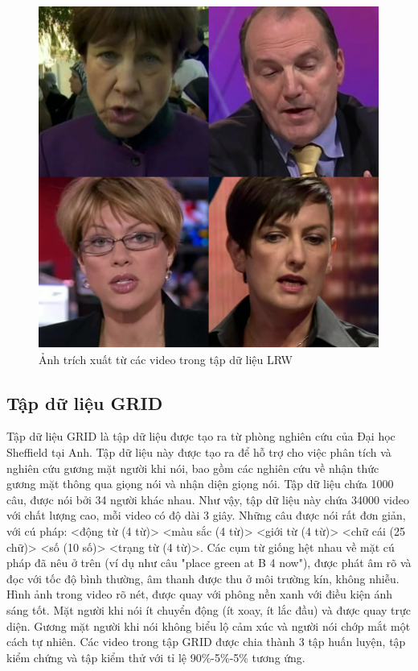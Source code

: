 \begin{figure}[H]
    \centering
    \includegraphics[width=12cm]{./content/materials/lrw.png}
    \caption{Ảnh trích xuất từ các video trong tập dữ liệu LRW}
\end{figure}

\subsection{Tập dữ liệu GRID \cite{grid}}

Tập dữ liệu GRID là tập dữ liệu được tạo ra từ phòng nghiên cứu của Đại học Sheffield tại Anh. Tập dữ liệu này được tạo ra để hỗ trợ cho việc phân tích và nghiên cứu gương mặt người khi nói, bao gồm các nghiên cứu về nhận thức gương mặt thông qua giọng nói và nhận diện giọng nói. Tập dữ liệu chứa 1000 câu, được nói bởi 34 người khác nhau. Như vậy, tập dữ liệu này chứa 34000 video với chất lượng cao, mỗi video có độ dài 3 giây. Những câu được nói rất đơn giản, với cú pháp: <động từ (4 từ)> <màu sắc (4 từ)> <giới từ (4 từ)> <chữ cái (25 chữ)> <số (10 số)> <trạng từ (4 từ)>. Các cụm từ giống hệt nhau về mặt cú pháp đã nêu ở trên (ví dụ như câu "place green at B 4 now"), được phát âm rõ và đọc với tốc độ bình thường, âm thanh được thu ở môi trường kín, không nhiễu. Hình ảnh trong video rõ nét, được quay với phông nền xanh với điều kiện ánh sáng tốt. Mặt người khi nói ít chuyển động (ít xoay, ít lắc đầu) và được quay trực diện. Gương mặt người khi nói không biểu lộ cảm xúc và người nói chớp mắt một cách tự nhiên. Các video trong tập GRID được chia thành 3 tập huấn luyện, tập kiểm chứng và tập kiểm thử với tỉ lệ 90\%-5\%-5\% tương ứng.

